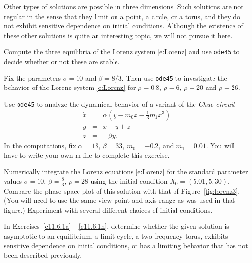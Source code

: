 \documentclass{ximera}
\begin{document}
Other types of solutions are possible in three dimensions.  Such solutions
are not regular in the sense that they limit on a point, a circle, or a
torus, and they do not exhibit sensitive dependence on initial conditions.  
Although the existence of these other solutions is quite an interesting
topic, we will not pursue it here. 


\EXER

\CEXER



\begin{exercise} \label{c11.4.1}
Compute the three equilibria of the Lorenz system \eqref{e:Lorenz}
and use {\tt ode45} to decide whether or not these are stable.
\end{exercise}

\begin{exercise} \label{c11.4.2}
Fix the parameters $\sigma=10$ and $\beta = 8/3$.  Then
use {\tt ode45} to investigate the behavior of the Lorenz system
\eqref{e:Lorenz} for $\rho=0.8$, $\rho=6$, $\rho=20$ and $\rho=26$.
\end{exercise}

\begin{exercise} \label{c11.4.3}
Use {\tt ode45} to analyze the dynamical behavior of a variant of the 
{\em Chua circuit}
\begin{eqnarray*}
  \dot{x} &=& \alpha\left(y-m_0x-\frac{1}{3}m_1x^3\right) \\
  \dot{y} &=& x-y+z \\
  \dot{z} &=& - \beta y.
\end{eqnarray*}
In the computations, fix $\alpha=18$, $\beta=33$, $m_0=-0.2$, and $m_1=0.01$.
You will have to write your own m-file to complete this exercise. 
\end{exercise}

\begin{exercise} \label{c11.4.3a}
Numerically integrate the Lorenz equations \eqref{e:Lorenz} for the standard 
parameter values $\sigma=10$, $\beta=\frac{8}{3}$, $\rho=28$ using the initial 
condition $X_0 =(5.01,5,30)$.  Compare the phase space plot of this solution 
with that of Figure~\ref{fig:lorenz3}.  (You will need to use the same view
point and axis range as was used in that figure.)  Experiment with several 
different choices of initial conditions.
\end{exercise}


\noindent In Exercises~\ref{c11.6.1a} -- \ref{c11.6.1h}, determine whether the 
given solution is asymptotic to an equilibrium, a limit cycle, a two-frequency 
torus, exhibits sensitive dependence on initial conditions, or has a limiting 
behavior that has not been described previously.
\end{document}
